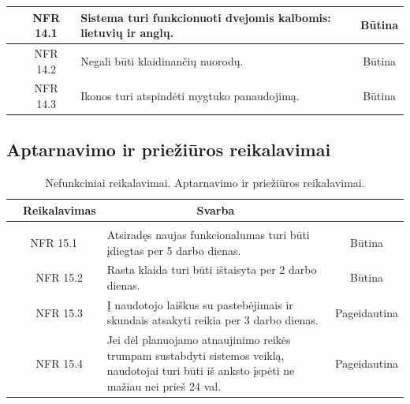 \documentclass{VUMIFPSkursinis}
\begin{document}
\begin{table}[H]
\begin{tabular}{|p{1cm}|p{1cm}|p{}|p{}|}
	\hline
		\multicolumn{1}{|c}{}&
		\multicolumn{1}{c|}{NFR 14.1}&
		{Sistema turi funkcionuoti dvejomis kalbomis: lietuvių ir anglų.}&
		\multicolumn{1}{c|}{Būtina}\\
		
		\hline
		\multicolumn{1}{|c}{}&
		\multicolumn{1}{c|}{NFR 14.2}&
		{Negali būti klaidinančių nuorodų.}&
		\multicolumn{1}{c|}{Būtina}\\
		
		\hline
		\multicolumn{1}{|c}{}&
		\multicolumn{1}{c|}{NFR 14.3}&
		{Ikonos turi atspindėti mygtuko panaudojimą.}&
		\multicolumn{1}{c|}{Būtina}\\
		
	\hline
	\end{tabular}		
	\end{table}
\subsection{Aptarnavimo ir priežiūros reikalavimai}
\begin{table}[H]
	\caption{Nefunkciniai reikalavimai. Aptarnavimo ir priežiūros reikalavimai.}
	\begin{tabular}{|p{1cm}|p{1cm}|p{}|p{}|}
	\hline 
\rowcolor{gray!50}
		\multicolumn{2}{|c|}{{\bfseries Kodas}}&
		\multicolumn{1}{c|}{{\bfseries Reikalavimas}}&
		\multicolumn{1}{c|}{{\bfseries Svarba}}\\
\hline
\rowcolor{lightgray}
\multicolumn{4}{|c|}{Aptarnavimo ir priežiūros reikalavimai}\\		

\hline
	\multicolumn{2}{|c|}{NFR 15.1}&
	{Atsiradęs naujas funkcionalumas turi būti įdiegtas per 5 darbo dienas.
}&		
	\multicolumn{1}{c|}{Būtina}\\
\hline
	\multicolumn{1}{|c}{}&
	\multicolumn{1}{c|}{NFR 15.2}&
	{Rasta klaida turi būti ištaisyta per 2 darbo dienas.
}&		
	\multicolumn{1}{c|}{Būtina}\\

\hline
	\multicolumn{1}{|c}{}&
	\multicolumn{1}{c|}{NFR 15.3}&
	{Į naudotojo laiškus su pastebėjimais ir skundais atsakyti reikia per 3 darbo dienas.
}&		
	\multicolumn{1}{c|}{Pageidautina}\\
	
\hline
	\multicolumn{1}{|c}{}&
	\multicolumn{1}{c|}{NFR 15.4}&
	{Jei dėl planuojamo atnaujinimo reikės trumpam sustabdyti
sistemos veiklą, naudotojai turi būti iš anksto įspėti ne mažiau nei prieš 24 val.
}&		
	\multicolumn{1}{c|}{Pageidautina}\\	
			
	\hline
	\end{tabular}		
	\end{table}
\end{document}
